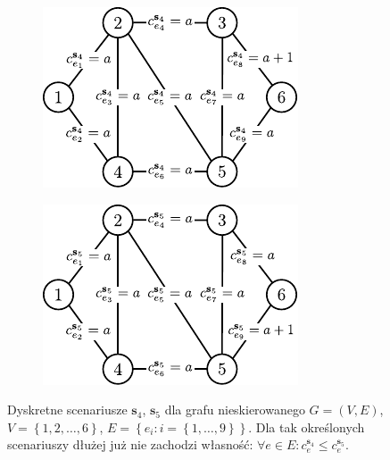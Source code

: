 \begin{figure}[!htbp]
	\null\hfill
	\begin{subfigure}[b]{0.3\textwidth}
		\includegraphics[width=\textwidth]{Chapter_II/MIN-MAX-DESC2-example/a}
		\caption{}
		\label{fig:minmaxexample:a}
	\end{subfigure}
	\hfill
	\begin{subfigure}[b]{0.3\textwidth}
		\includegraphics[width=\textwidth]{Chapter_II/MIN-MAX-DESC2-example/b}
		\caption{}
		\label{fig:minmaxexample:b}
	\end{subfigure}
	\hfill\null
	\caption{
		Dyskretne scenariusze $\textbf{s}_{4}$, $\textbf{s}_{5}$ dla grafu nieskierowanego $G = \left( V, E \right)$, $V = \left\{ 1, 2, \dots, 6 \right\}$, $E = \left\{ e_{i} : i = \left\{ 1, \dots, 9 \right\} \right\}$. Dla tak określonych scenariuszy dłużej już nie zachodzi własność: $\forall e \in E : c^{\textbf{s}_{4}}_{e} \leqslant c^{\textbf{s}_{5}}_{e}$.
	}
	\label{fig:minmaxexample}
\end{figure}

